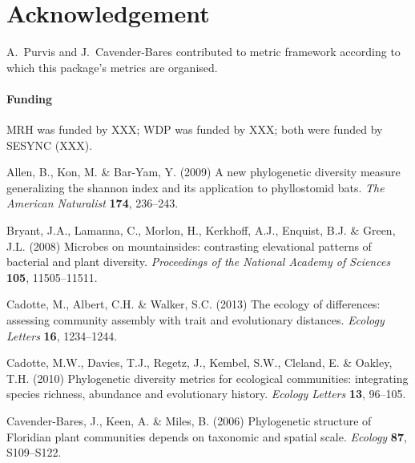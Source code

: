 \documentclass{bioinfo}
\begin{document}
\section*{Acknowledgement}
A.\ Purvis and J.\ Cavender-Bares contributed to metric framework
according to which this package's metrics are organised.
\paragraph{Funding\textcolon}MRH was funded by XXX; WDP was funded by
XXX; both were funded by SESYNC (XXX).

\begin{thebibliography}{30}
\providecommand{\natexlab}[1]{#1}
\providecommand{\url}[1]{\texttt{#1}}
\providecommand{\urlprefix}{URL }

Allen, B., Kon, M. \& Bar-Yam, Y. (2009) A new phylogenetic diversity measure
  generalizing the shannon index and its application to phyllostomid bats.
  \emph{The American Naturalist} \textbf{174}, 236--243.

Bryant, J.A., Lamanna, C., Morlon, H., Kerkhoff, A.J., Enquist, B.J. \& Green,
  J.L. (2008) Microbes on mountainsides: contrasting elevational patterns of
  bacterial and plant diversity. \emph{Proceedings of the National Academy of
  Sciences} \textbf{105}, 11505--11511.

Cadotte, M., Albert, C.H. \& Walker, S.C. (2013) The ecology of differences:
  assessing community assembly with trait and evolutionary distances.
  \emph{Ecology Letters} \textbf{16}, 1234--1244.

Cadotte, M.W., Davies, T.J., Regetz, J., Kembel, S.W., Cleland, E. \& Oakley,
  T.H. (2010) Phylogenetic diversity metrics for ecological communities:
  integrating species richness, abundance and evolutionary history.
  \emph{Ecology Letters} \textbf{13}, 96--105.

Cavender-Bares, J., Keen, A. \& Miles, B. (2006) {Phylogenetic structure of
  Floridian plant communities depends on taxonomic and spatial scale}.
  \emph{Ecology} \textbf{87}, S109--S122.


\end{thebibliography}
\end{document}
